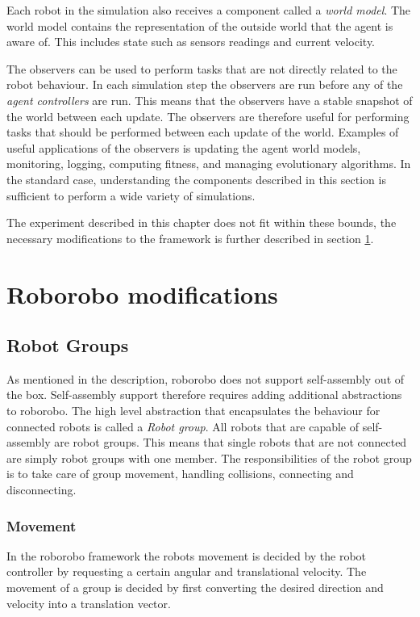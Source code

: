 Each robot in the simulation also receives a component called a \emph{world model}.
The world model contains the representation of the outside world that the agent is aware of.
This includes state such as sensors readings and current velocity.

The observers can be used to perform tasks that are not directly related to the robot behaviour.
In each simulation step the observers are run before any of the \emph{agent controllers} are run.
This means that the observers have a stable snapshot of the world between each update.
The observers are therefore useful for performing tasks that should be performed between each update of the world.
Examples of useful applications of the observers is updating the agent world models, monitoring, logging, computing fitness, and managing evolutionary algorithms.
In the standard case, understanding the components described in this section is sufficient to perform a wide variety of simulations.


The experiment described in this chapter does not fit within these bounds, the necessary modifications to the framework is further described in section \ref{sec:modifications}.



\section{Roborobo modifications}
\label{sec:modifications}

\subsection{Robot Groups}
As mentioned in the description, roborobo does not support self-assembly out of the box.
Self-assembly support therefore requires adding additional abstractions to roborobo.
The high level abstraction that encapsulates the behaviour for connected robots is called a \emph{Robot group}.
All robots that are capable of self-assembly are robot groups.
This means that single robots that are not connected are simply robot groups with one member.
The responsibilities of the robot group is to take care of group movement, handling collisions, connecting and disconnecting. 
	
\subsubsection{Movement}
In the roborobo framework the robots movement is decided by the robot controller by requesting a certain angular and translational velocity.
The movement of a group is decided by first converting the desired direction and velocity into a translation vector.
	
